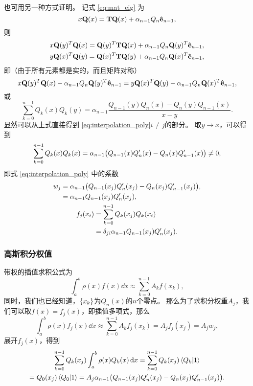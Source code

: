 \documentclass[a4paper,unicode]{report}
\begin{document}
也可用另一种方式证明。
记式 \eqref{eq:mat_eig} 为
\begin{equation}\label{eq:mat_eig_simple}
    x\vb{Q}(x) = \vb{T} \vb{Q}(x) + \alpha_{n-1}Q_n \vu{e}_{n-1},
\end{equation}
则
\begin{gather}
    x\vb{Q}(y)^T\vb{Q}(x) = \vb{Q}(y)^T\vb{T} \vb{Q}(x) + \alpha_{n-1}Q_n \vb{Q}(y)^T\vu{e}_{n-1},\\
    y\vb{Q}(x)^T\vb{Q}(y) = \vb{Q}(x)^T\vb{T} \vb{Q}(y) + \alpha_{n-1}Q_n \vb{Q}(x)^T\vu{e}_{n-1},
\end{gather}
即（由于所有元素都是实的，而且矩阵对称）
\begin{equation}
    x\vb{Q}(y)^T\vb{Q}(x) - \alpha_{n-1}Q_n \vb{Q}(y)^T\vu{e}_{n-1} = y\vb{Q}(x)^T\vb{Q}(y) - \alpha_{n-1}Q_n \vb{Q}(x)^T\vu{e}_{n-1},
\end{equation}
或
\begin{equation} \label{eq:simple_fj}
    \sum_{k=0}^{n-1} Q_k(x)Q_k(y) = \alpha_{n-1} \frac{Q_{n-1}(y)Q_n(x) - Q_n(y)Q_{n-1}(x)}{x-y}.
\end{equation}
显然可以从上式直接得到 \eqref{eq:interpolation_poly}$i\neq j$的部分。
取$y\to x$，可以得到
\begin{equation}
    \sum_{k=0}^{n-1} Q_k(x)Q_k(x) = \alpha_{n-1} \qty(Q_{n-1}(x)Q'_n(x) - Q_n(x)Q'_{n-1}(x)) \neq 0,
\end{equation}
即式 \eqref{eq:interpolation_poly} 中的系数
\begin{gather}
    \begin{aligned}
        w_j &{}=\alpha_{n-1} \qty(Q_{n-1}(x_j)Q'_n(x_j) - Q_n(x_j)Q'_{n-1}(x_j)),\\
        &{} = \alpha_{n-1} Q_{n-1}(x_j)Q'_n(x_j),
    \end{aligned}\\
    \begin{aligned}
        f_j(x_i) &{}= \sum_{k=0}^{n-1} Q_k(x_j)Q_k(x_i) \\
        &{}= \delta_{ji}\alpha_{n-1} Q_{n-1}(x_j)Q'_n(x_j).
    \end{aligned}
\end{gather}

\subsubsection{高斯积分权值}
带权的插值求积公式为
\begin{equation}
    \int_a^b\rho(x)f(x)\dd{x} \approx \sum_{k=0}^{n-1} A_kf(x_k),
\end{equation}
同时，我们也已经知道，$\qty{x_k}$为$Q_n(x)$的$n$个零点。
那么为了求积分权重$A_j$，我们可以取$f(x) = f_j(x)$，即插值多项式，那么
\begin{equation}
    \int_a^b\rho(x)f_j(x)\dd{x} \approx \sum_{k=0}^{n-1} A_kf_j(x_k) = A_jf_j(x_j) = A_jw_j,
\end{equation}
展开$f_j(x)$，得到
\begin{multline}
    \sum_{k=0}^{n-1} Q_k(x_j) \int_a^b\rho(x)Q_k(x)\dd{x}
    = \sum_{k=0}^{n-1} Q_k(x_j) \braket{Q_k}{1}\\
    = Q_0(x_j) \braket{Q_0}{1}
    = A_j \alpha_{n-1} \qty(Q_{n-1}(x_j)Q'_n(x_j) - Q_n(x_j)Q'_{n-1}(x_j)).
\end{multline}
\end{document}
